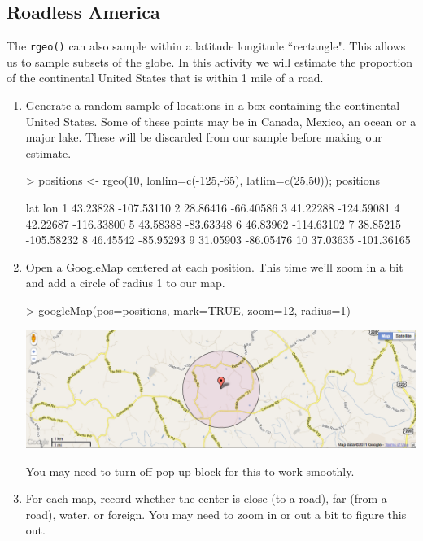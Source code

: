 \subsection{Roadless America}

The \verb!rgeo()! can also sample within a latitude longitude ``rectangle".
This allows us to sample subsets of the globe.  In this activity we will estimate 
the proportion of the continental United States that is within 1 mile of a road.

\begin{enumerate}
\item
Generate a random sample of locations in a box containing the continental United States.
Some of these points may be in Canada, Mexico, an ocean or a major lake.  These 
will be discarded from our sample before making our estimate.
\begin{Schunk}
\begin{Sinput}
> positions <- rgeo(10, lonlim=c(-125,-65), latlim=c(25,50)); positions
\end{Sinput}
\begin{Soutput}
        lat        lon
1  43.23828 -107.53110
2  28.86416  -66.40586
3  41.22288 -124.59081
4  42.22687 -116.33800
5  43.58388  -83.63348
6  46.83962 -114.63102
7  38.85215 -105.58232
8  46.45542  -85.95293
9  31.05903  -86.05476
10 37.03635 -101.36165
\end{Soutput}
\end{Schunk}

\item
Open a GoogleMap centered at each position.  This time we'll zoom in a bit and add 
a circle of radius 1 to our map.

\begin{Schunk}
\begin{Sinput}
> googleMap(pos=positions, mark=TRUE, zoom=12, radius=1)
\end{Sinput}
\end{Schunk}


\begin{center}
\includegraphics[width=.8\textwidth]{images/google-roadless}
\end{center}
You may need to turn off pop-up block for this to work smoothly.
\item
For each map, record whether the center is close (to a road), far (from a road), water, or foreign.
You may need to zoom in or out a bit to figure this out.

\end{enumerate}

